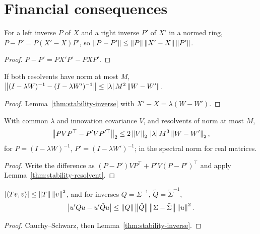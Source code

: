 \section{Financial consequences}\label{sec:bp-stability}

\begin{lemma}\label{thm:stability-inverse}
  \leanok
  For a left inverse $P$ of $X$ and a right inverse $P'$ of $X'$ in a normed
  ring, $P-P'=P(X'-X)P'$, so $\left\lVert P-P'\right\rVert\le\left\lVert P\right\rVert\left\lVert X'-X\right\rVert\left\lVert P'\right\rVert$.
\end{lemma}
\begin{proof}\leanok
  $P-P'=PX'P'-PXP'$.
\end{proof}

\begin{lemma}[Resolvent]\label{thm:stability-resolvent}
  \leanok
  If both resolvents have norm at most $M$,
  $\left\lVert(I-\lambda W)^{-1}-(I-\lambda W')^{-1}\right\rVert\le\left\lvert\lambda\right\rvert M^2\left\lVert W-W'\right\rVert$.
\end{lemma}
\begin{proof}\leanok
  Lemma~\ref{thm:stability-inverse} with $X'-X=\lambda(W-W')$.
\end{proof}

\begin{theorem}\label{thm:stability-covariance}
  \leanok
  With common $\lambda$ and innovation covariance $V$, and resolvents of norm
  at most $M$,
  \[
    \left\lVert PVP^\top-P'VP'^\top\right\rVert_2\le2\left\lVert V\right\rVert_2\,\left\lvert\lambda\right\rvert M^3\left\lVert W-W'\right\rVert_2 ,
  \]
  for $P=(I-\lambda W)^{-1}$, $P'=(I-\lambda W')^{-1}$; in the spectral norm for
  real matrices.
\end{theorem}
\begin{proof}\leanok
  Write the difference as $(P-P')VP^\top+P'V(P-P')^\top$ and apply
  Lemma~\ref{thm:stability-resolvent}.
\end{proof}

\begin{lemma}\label{thm:stability-quadratic}
  \leanok
  $\left\lvert\left\langle Tv,v\right\rangle\right\rvert\le\left\lVert T\right\rVert\left\lVert v\right\rVert^2$, and for inverses $Q=\Sigma^{-1}$,
  $\tilde Q=\tilde\Sigma^{-1}$,
  \[
    \left\lvert u'Qu-u'\tilde Qu\right\rvert\le\left\lVert Q\right\rVert\left\lVert\tilde
    Q\right\rVert\left\lVert\Sigma-\tilde\Sigma\right\rVert\left\lVert u\right\rVert^2 .
  \]
\end{lemma}
\begin{proof}\leanok
  Cauchy--Schwarz, then Lemma~\ref{thm:stability-inverse}.
\end{proof}

